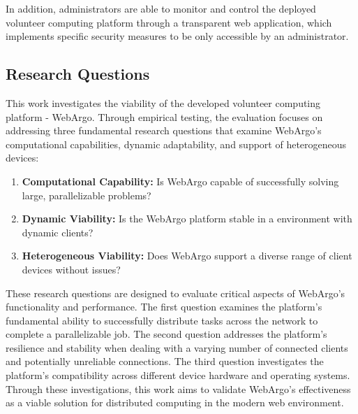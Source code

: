 In addition, administrators are able to monitor and control the deployed volunteer computing platform through a transparent web application, which implements specific security measures to be only accessible by an administrator.

\subsection{Research Questions}
\label{subsec:into:objectives:questions}
This work investigates the viability of the developed volunteer computing platform - WebArgo. Through empirical testing, the evaluation focuses on addressing three fundamental research questions that examine WebArgo's computational capabilities, dynamic adaptability, and support of heterogeneous devices:
\begin{enumerate}
    \item \textbf{Computational Capability:} Is WebArgo capable of successfully solving large, parallelizable problems?
    \item \textbf{Dynamic Viability:} Is the WebArgo platform stable in a environment with dynamic clients?
    \item \textbf{Heterogeneous Viability:} Does WebArgo support a diverse range of client devices without issues?
\end{enumerate}
These research questions are designed to evaluate critical aspects of WebArgo's functionality and performance. The first question examines the platform's fundamental ability to successfully distribute tasks across the network to complete a parallelizable job. The second question addresses the platform's resilience and stability when dealing with a varying number of connected clients and potentially unreliable connections. The third question investigates the platform's compatibility across different device hardware and operating systems. Through these investigations, this work aims to validate WebArgo's effectiveness as a viable solution for distributed computing in the modern web environment.

